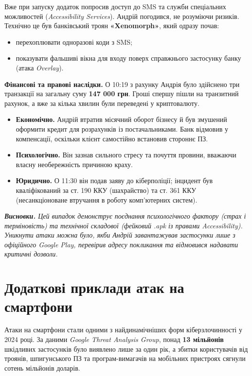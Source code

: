 Вже при запуску додаток попросив доступ до SMS та служби спеціальних можливостей (\textit{Accessibility Services}). Андрій погодився, не розуміючи ризиків.
Технічно це був банківський троян \textbf{«Xenomorph»}, який одразу почав:
\begin{itemize}
    \item перехоплювати одноразові коди з SMS;
    \item показувати фальшиві вікна для входу поверх справжнього застосунку банку (атака \textit{Overlay}).
\end{itemize}

\textbf{Фінансові та правові наслідки.}
О 10:19 з рахунку Андрія було здійснено три транзакції на загальну суму \textbf{147 000 грн}. Гроші спершу пішли на транзитний рахунок, а вже за кілька хвилин були переведені у криптовалюту.

\begin{itemize}
    \item \textbf{Економічно.} Андрій втратив місячний оборот бізнесу й був змушений оформити кредит для розрахунків із постачальниками. Банк відмовив у компенсації, оскільки клієнт самостійно встановив стороннє ПЗ.
    \item \textbf{Психологічно.} Він зазнав сильного стресу та почуття провини, вважаючи власну необережність причиною краху.
    \item \textbf{Юридично.} О 11:30 він подав заяву до кіберполіції; інцидент був кваліфікований за ст. 190 ККУ (шахрайство) та ст. 361 ККУ (несанкціоноване втручання в роботу комп’ютерних систем).
\end{itemize}

\newpage

\textit{\textbf{Висновки.} Цей випадок демонструє поєднання психологічного фактору (страх і терміновість) та технічної складової (фейковий .apk із правами Accessibility). Уникнути атаки можна було, якби Андрій завантажував застосунки лише з офіційного Google Play, перевірив адресу покликання та відмовився надавати критичні дозволи.}

\section{Додаткові приклади атак на смартфони}

Атаки на смартфони стали одними з найдинамічніших форм кіберзлочинності у 2024 році. За даними \textit{Google Threat Analysis Group}, понад \textbf{13 мільйонів} шкідливих застосунків було виявлено лише за один рік, а збитки користувачів від троянів, шпигунського ПЗ та програм-вимагачів на мобільних пристроях сягнули сотень мільйонів доларів.

